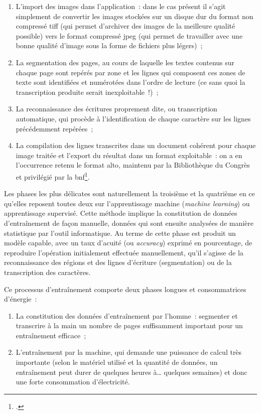 \documentclass[a4paper,12pt,twoside]{book}
\begin{document}
			\begin{enumerate}
				\item L'import des images dans l'application~: dans le cas présent il s'agit simplement de convertir les images stockées sur un disque dur du format non compressé \textsf{tiff} (qui permet d'archiver des images de la meilleure qualité possible) vers le format compressé \textsf{jpeg} (qui permet de travailler avec une bonne qualité d'image sous la forme de fichiers plus légers)~;
				\item La \gls{segmentation} des pages, au cours de laquelle les textes contenus sur chaque page sont repérés par zone et les lignes qui composent ces zones de texte sont identifiées et numérotées dans l'ordre de lecture (ce sans quoi la transcription produite serait inexploitable~!)~;
				\item La reconnaissance des écritures proprement dite, ou transcription automatique, qui procède à l'identification de chaque caractère sur les lignes précédemment repérées~;
				\item La compilation des lignes transcrites dans un document cohérent pour chaque image traitée et l'export du résultat dans un format exploitable~: on a en l'occurrence retenu le format \gls{alto}, maintenu par la Bibliothèque du Congrès et privilégié par la \gls{bnf}\footcite{TechniquesFormatsConversion2022, stokesEScriptoriumVREManuscript2021}.
			\end{enumerate}
			
			Les phases les plus délicates sont naturellement la troisième et la quatrième en ce qu'elles reposent toutes deux sur l'apprentissage machine (\textit{machine learning}) ou apprentissage supervisé. Cette méthode implique la constitution de données d'entraînement de façon manuelle, données qui sont ensuite analysées de manière statistique par l'outil informatique. Au terme de cette phase est produit un modèle capable, avec un taux d'acuité (ou \textit{accuracy}) exprimé en pourcentage, de reproduire l'opération initialement effectuée manuellement, qu'il s'agisse de la reconnaissance des régions et des lignes d'écriture (\gls{segmentation}) ou de la transcription des caractères.
			
			Ce processus d'entraînement comporte deux phases longues et consommatrices d'énergie~:
			
			\begin{enumerate}
				\item La constitution des données d'entraînement par l'homme~: segmenter et transcrire à la main un nombre de pages suffisamment important pour un entraînement efficace~;
				\item L'entraînement par la machine, qui demande une puissance de calcul très importante (selon le matériel utilisé et la quantité de données, un entraînement peut durer de quelques heures à… quelques semaines) et donc une forte consommation d'électricité.
			\end{enumerate}
			
\end{document}
